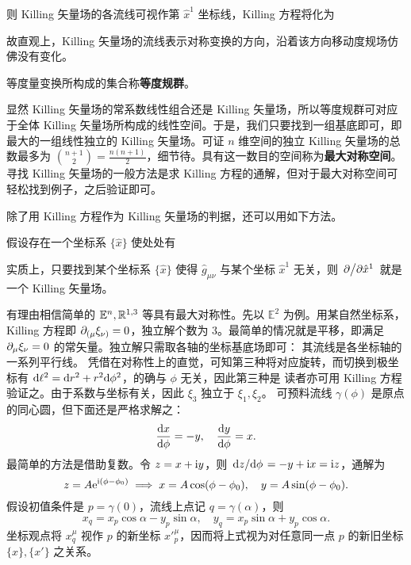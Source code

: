 则 Killing 矢量场的各流线可视作第 $\hat x^1$ 坐标线，Killing 方程将化为

故直观上，Killing 矢量场的流线表示对称变换的方向，沿着该方向移动度规场仿佛没有变化。



等度量变换所构成的集合称\textbf{等度规群}。

显然 Killing 矢量场的常系数线性组合还是 Killing 矢量场，所以等度规群可对应于全体 Killing 矢量场所构成的线性空间。于是，我们只要找到一组基底即可，即最大的一组线性独立的 Killing 矢量场。可证 $n$ 维空间的独立 Killing 矢量场的总数最多为 $\binom{n+1}{2}=\frac{n(n+1)}2$，细节待。具有这一数目的空间称为\textbf{最大对称空间}。寻找 Killing 矢量场的一般方法是求 Killing 方程的通解，但对于最大对称空间可轻松找到例子，之后验证即可。

除了用 Killing 方程作为 Killing 矢量场的判据，还可以用如下方法。



假设存在一个坐标系 $\{\hat x\}$ 使处处有



实质上，只要找到某个坐标系 $\{\hat x\}$ 使得 $\hat g_{\mu\nu}$ 与某个坐标 $\hat x^1$ 无关，则 $\pdv*{\hat x^1}$ 就是一个 Killing 矢量场。


有理由相信简单的 $\mathbb{E}^n, \mathbb{R}^{1,3}$ 等具有最大对称性。先以 $\mathbb{E}^2$ 为例。用某自然坐标系，Killing 方程即 $\partial_{(\mu}\xi_{\nu)}=0$，独立解个数为 3。最简单的情况就是平移，即满足 $\partial_\mu\xi_\nu=0$ 的常矢量。独立解只需取各轴的坐标基底场即可：
其流线是各坐标轴的一系列平行线。
凭借在对称性上的直觉，可知第三种将对应旋转，而切换到极坐标有 $\dd \ell^2=\dd r^2+r^2\dd\phi^2$，的确与 $\phi$ 无关，因此第三种是
读者亦可用 Killing 方程验证之。由于系数与坐标有关，因此 $\xi_3$ 独立于 $\xi_1,\xi_2$。
可预料流线 $\gamma(\phi)$ 是原点的同心圆，但下面还是严格求解之：
\[
    \dv{x}{\phi}=-y,\quad \dv{y}{\phi}=x.
\]
最简单的方法是借助复数。令 $z=x+\mathrm{i} y$，则 $\dv*{z}{\phi}=-y+\mathrm{i} x=\mathrm{i} z$，通解为
\[
    z=A\mathrm{e}^{\mathrm{i}(\phi-\phi_0)}\implies x=A\cos(\phi-\phi_0),\quad y=A\sin(\phi-\phi_0).
\]
假设初值条件是 $p=\gamma(0)$，流线上点记 $q=\gamma(\alpha)$，则
\[
    x_q=x_p\cos\alpha-y_p\sin\alpha,\quad y_q=x_p\sin\alpha+y_p\cos\alpha.
\]
坐标观点将 $x_q^\mu$ 视作 $p$ 的新坐标 $x'^\mu_p$，因而将上式视为对任意同一点 $p$ 的新旧坐标 $\{x\},\{x'\}$ 之关系。

